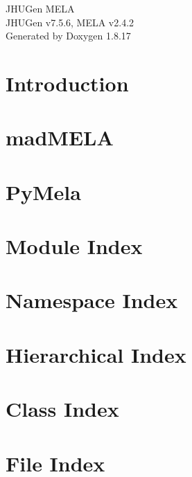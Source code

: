 \let\mypdfximage\pdfximage\def\pdfximage{\immediate\mypdfximage}\documentclass[twoside]{book}
\newcommand{\+}{\discretionary{\mbox{\scriptsize$\hookleftarrow$}}{}{}}
\newcommand{\clearemptydoublepage}{%
  \newpage{\pagestyle{empty}\cleardoublepage}%
}
\begin{document}
\hypersetup{pageanchor=false,
             bookmarksnumbered=true,
             pdfencoding=unicode
            }
\begin{titlepage}
\vspace*{7cm}
\begin{center}%
{\Large J\+H\+U\+Gen M\+E\+LA \\[1ex]\large J\+H\+U\+Gen v7.\+5.\+6, M\+E\+LA v2.\+4.\+2 }\\
\vspace*{1cm}
{\large Generated by Doxygen 1.8.17}\\
\end{center}
\end{titlepage}
\clearemptydoublepage
{}
\tableofcontents
\clearemptydoublepage
{}
\hypersetup{pageanchor=true}

\chapter{Introduction}
\label{index}\hypertarget{index}{}
\chapter{mad\+M\+E\+LA}
\label{madMELA}

\chapter{Py\+Mela}
\label{PyMela_page}

\chapter{Module Index}

\chapter{Namespace Index}

\chapter{Hierarchical Index}

\chapter{Class Index}

\chapter{File Index}

\end{document}
